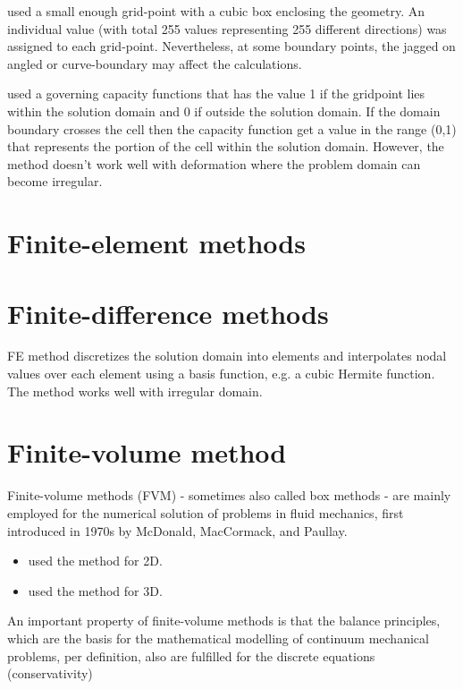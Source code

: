 \citep{Huiskamp1998, Weixue1996} used a small enough grid-point with a cubic box
enclosing the geometry. An individual value (with total 255 values representing
255 different directions) was assigned to each grid-point. Nevertheless, at some
boundary points, the jagged on angled or curve-boundary may affect the
calculations.

\citep{Cherry2000, Cherry2000b} used a governing capacity functions that has the
value 1 if the gridpoint lies within the solution domain and 0 if outside the
solution domain. If the domain boundary crosses the cell then the capacity
function get a value in the range (0,1) that represents the portion of the cell
within the solution domain. However, the method doesn't work well with
deformation where the problem domain can become irregular.

\section{Finite-element methods}
\label{sec:finite-element-method}



\section{Finite-difference methods}
\label{sec:finite-difference-method}

FE method discretizes the solution domain into elements and interpolates nodal
values over each element using a basis function, e.g. a cubic Hermite function.
The method works well with irregular domain. 

\section{Finite-volume method}
\label{sec:finite-volume-methods}

Finite-volume methods (FVM) - sometimes also called box methods - are
mainly employed for the numerical solution of problems in fluid mechanics, first
introduced in 1970s by McDonald, MacCormack, and
Paullay.
\begin{itemize}
  \item  \citep{Harrild1997} used the method for 2D.
  
  \item  \citep{Harrild2000fm} used the method for 3D.
\end{itemize} 

An important property of finite-volume methods is that the balance principles,
which are the basis for the mathematical modelling of continuum mechanical
problems, per definition, also are fulfilled for the discrete equations
(conservativity)


